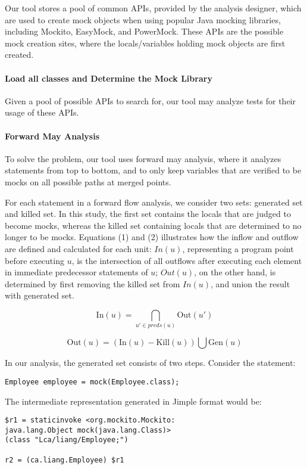 Our tool stores a pool of common APIs, provided by the analysis designer, which are used to create mock objects when using popular Java mocking libraries, including Mockito, EasyMock, and PowerMock. These APIs are the possible mock creation sites, where the locals/variables holding mock objects are first created.

\paragraph{Load all classes and Determine the Mock Library}
\label{subsubsec:library}

Given a pool of possible APIs to search for, our tool may analyze tests for their usage of these APIs.%


\paragraph{Forward May Analysis}
\label{subsubsec:forward}

To solve the problem, our tool uses forward may analysis, where it analyzes statements from top to bottom, and to only keep variables that are verified to be mocks on all possible paths at merged points. 

For each statement in a forward flow analysis, we consider two sets: generated set and killed set. In this study, the first set contains the locals that are judged to become mocks, whereas the killed set containing locals that are determined to no longer to be mocks. Equations (1) and (2) illustrates how the inflow and outflow are defined and calculated for each unit: $In(u)$, representing a program point before executing $u$, is the intersection of all outflows after executing each element in immediate predecessor statements of $u$; $Out(u)$, on the other hand, is determined by first removing the killed set from $In(u)$, and union the result with generated set. 

\begin{equation}
\mathrm{In}(u) = \bigcap_{u' \in preds(u)} \mathrm{Out}(u') 
\end{equation}

\begin{equation}
\mathrm{Out}(u) = (\mathrm{In}(u) - \mathrm{Kill}(u)) \bigcup \mathrm{Gen}(u) 
\end{equation}

In our analysis, the generated set consists of two steps. Consider the statement: 
\begin{lstlisting}
Employee employee = mock(Employee.class);
\end{lstlisting}
The intermediate representation generated in Jimple format would be:
\begin{lstlisting}
$r1 = staticinvoke <org.mockito.Mockito: 
java.lang.Object mock(java.lang.Class)>
(class "Lca/liang/Employee;")

r2 = (ca.liang.Employee) $r1
\end{lstlisting}

